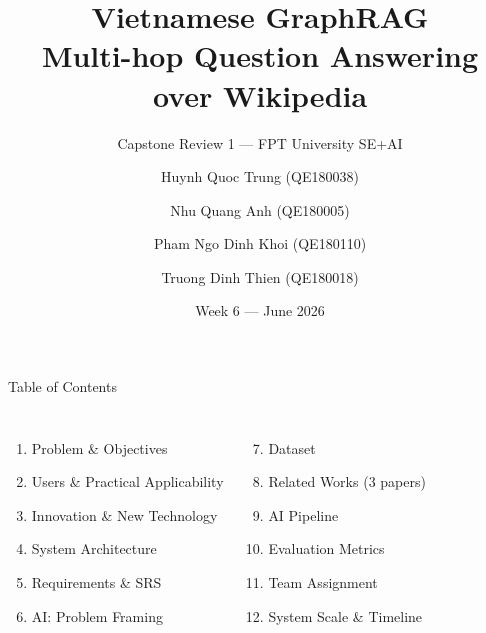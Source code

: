 \documentclass[aspectratio=169]{beamer}
\title[Vietnamese GraphRAG --- Multi-hop QA]{Vietnamese GraphRAG\\Multi-hop Question Answering over Wikipedia}
\subtitle{Capstone Review 1 --- FPT University SE+AI}
\author[Trung, Anh, Khoi, Thien]{%
  Huynh Quoc Trung (QE180038) \and
  Nhu Quang Anh (QE180005) \and
  Pham Ngo Dinh Khoi (QE180110) \and
  Truong Dinh Thien (QE180018)
}
\institute{FPT University\\[4pt]\small\textit{Supervisors:} Lê Trung Hiếu \quad Đặng Nguyên Bình}
\date{Week 6 --- June 2026}
\begin{document}
\begin{frame}[plain]
\titlepage
\end{frame}

\begin{frame}{Table of Contents}
\begin{columns}[T]
\begin{enumerate}
  \item Problem \& Objectives
  \item Users \& Practical Applicability
  \item Innovation \& New Technology
  \item System Architecture
  \item Requirements \& SRS
  \item AI: Problem Framing
\end{enumerate}
\begin{enumerate}
  \setcounter{enumi}{6}
  \item Dataset
  \item Related Works (3 papers)
  \item AI Pipeline
  \item Evaluation Metrics
  \item Team Assignment
  \item System Scale \& Timeline
\end{enumerate}
\end{columns}
\end{frame}
\end{document}
